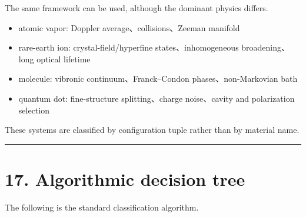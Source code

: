 \documentclass[
  10pt,
  a4paper,
]{article}
\providecommand{\tightlist}{%
  \setlength{\itemsep}{0pt}\setlength{\parskip}{0pt}}
\begin{document}
The same framework can be used, although the dominant physics differs.

\begin{itemize}
\tightlist
\item
  atomic vapor: Doppler average、collisions、Zeeman manifold
\item
  rare-earth ion: crystal-field/hyperfine states、inhomogeneous
  broadening、long optical lifetime
\item
  molecule: vibronic continuum、Franck--Condon phases、non-Markovian
  bath
\item
  quantum dot: fine-structure splitting、charge noise、cavity and
  polarization selection
\end{itemize}

These systems are classified by configuration tuple rather than by
material name.

\begin{center}\rule{0.5\linewidth}{0.5pt}\end{center}

\section{17. Algorithmic decision tree}\label{algorithmic-decision-tree}

The following is the standard classification algorithm.
\end{document}
